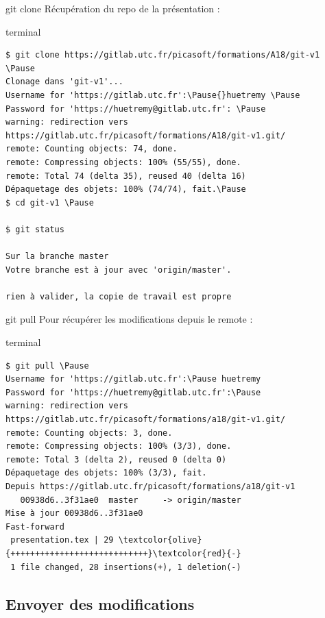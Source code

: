 \documentclass[usepdftitle=false]{beamer}
\newcommand{\Pause}{%
\ifdef{\Release}
  {\pause}
  {}
}
\begin{document}
\begin{frame}[fragile]{git clone}
	Récupération du repo de la présentation :
	\begin{beamercolorbox}[rounded=true,shadow=true]{terminal}
		\begin{Verbatim}
$ git clone https://gitlab.utc.fr/picasoft/formations/A18/git-v1 \Pause
Clonage dans 'git-v1'...
Username for 'https://gitlab.utc.fr':\Pause{}huetremy \Pause
Password for 'https://huetremy@gitlab.utc.fr': \Pause
warning: redirection vers https://gitlab.utc.fr/picasoft/formations/A18/git-v1.git/
remote: Counting objects: 74, done.
remote: Compressing objects: 100% (55/55), done.
remote: Total 74 (delta 35), reused 40 (delta 16)
Dépaquetage des objets: 100% (74/74), fait.\Pause
$ cd git-v1 \Pause

$ git status

Sur la branche master
Votre branche est à jour avec 'origin/master'.

rien à valider, la copie de travail est propre
		\end{Verbatim}
	\end{beamercolorbox}
\end{frame}

\begin{frame}[fragile]{git pull}
	Pour récupérer les modifications depuis le remote :
	\begin{beamercolorbox}[rounded=true,shadow=true]{terminal}
	\begin{Verbatim}
$ git pull \Pause
Username for 'https://gitlab.utc.fr':\Pause huetremy
Password for 'https://huetremy@gitlab.utc.fr':\Pause
warning: redirection vers https://gitlab.utc.fr/picasoft/formations/a18/git-v1.git/
remote: Counting objects: 3, done.
remote: Compressing objects: 100% (3/3), done.
remote: Total 3 (delta 2), reused 0 (delta 0)
Dépaquetage des objets: 100% (3/3), fait.
Depuis https://gitlab.utc.fr/picasoft/formations/a18/git-v1
   00938d6..3f31ae0  master     -> origin/master
Mise à jour 00938d6..3f31ae0
Fast-forward
 presentation.tex | 29 \textcolor{olive}{++++++++++++++++++++++++++++}\textcolor{red}{-}
 1 file changed, 28 insertions(+), 1 deletion(-)
	\end{Verbatim}
	\end{beamercolorbox}
\end{frame}

\subsection{Envoyer des modifications}
\end{document}
